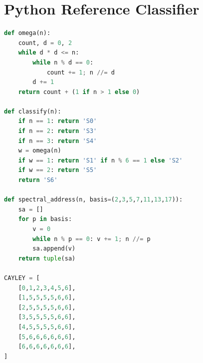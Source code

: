 \documentclass[10pt,twocolumn]{article}
\begin{document}
\appendix
\section{Python Reference Classifier}

\begin{lstlisting}[language=Python]
def omega(n):
    count, d = 0, 2
    while d * d <= n:
        while n % d == 0:
            count += 1; n //= d
        d += 1
    return count + (1 if n > 1 else 0)

def classify(n):
    if n == 1: return 'S0'
    if n == 2: return 'S3'
    if n == 3: return 'S4'
    w = omega(n)
    if w == 1: return 'S1' if n % 6 == 1 else 'S2'
    if w == 2: return 'S5'
    return 'S6'

def spectral_address(n, basis=(2,3,5,7,11,13,17)):
    sa = []
    for p in basis:
        v = 0
        while n % p == 0: v += 1; n //= p
        sa.append(v)
    return tuple(sa)

CAYLEY = [
    [0,1,2,3,4,5,6],
    [1,5,5,5,5,6,6],
    [2,5,5,5,5,6,6],
    [3,5,5,5,5,6,6],
    [4,5,5,5,5,6,6],
    [5,6,6,6,6,6,6],
    [6,6,6,6,6,6,6],
]
\end{lstlisting}
\end{document}
